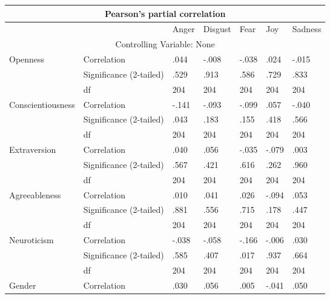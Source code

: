 \documentclass{llncs}
\begin{document}
\begin{table}[!ht]
\centering
\begin{tabular}{lllllll}
\hline
\multicolumn{7}{c}{Pearson's partial correlation}                                       \\ \hline
                  &                         & Anger & Disgust & Fear  & Joy   & Sadness \\
\multicolumn{7}{c}{Controlling Variable: None}                                          \\
Openness          & Correlation             & .044  & -.008   & -.038 & .024  & -.015   \\
                  & Significance (2-tailed) & .529  & .913    & .586  & .729  & .833    \\
                  & df                      & 204   & 204     & 204   & 204   & 204     \\
Conscientiousness & Correlation             & -.141 & -.093   & -.099 & .057  & -.040   \\
                  & Significance (2-tailed) & .043  & .183    & .155  & .418  & .566    \\
                  & df                      & 204   & 204     & 204   & 204   & 204     \\
Extraversion      & Correlation             & .040  & .056    & -.035 & -.079 & .003    \\
                  & Significance (2-tailed) & .567  & .421    & .616  & .262  & .960    \\
                  & df                      & 204   & 204     & 204   & 204   & 204     \\
Agreeableness     & Correlation             & .010  & .041    & .026  & -.094 & .053    \\
                  & Significance (2-tailed) & .881  & .556    & .715  & .178  & .447    \\
                  & df                      & 204   & 204     & 204   & 204   & 204     \\
Neuroticism       & Correlation             & -.038 & -.058   & -.166 & -.006 & .030    \\
                  & Significance (2-tailed) & .585  & .407    & .017  & .937  & .664    \\
                  & df                      & 204   & 204     & 204   & 204   & 204     \\
Gender            & Correlation             & .030  & .056    & .005  & -.041 & .050    \\

\end{tabular}
\end{table}
\end{document}
